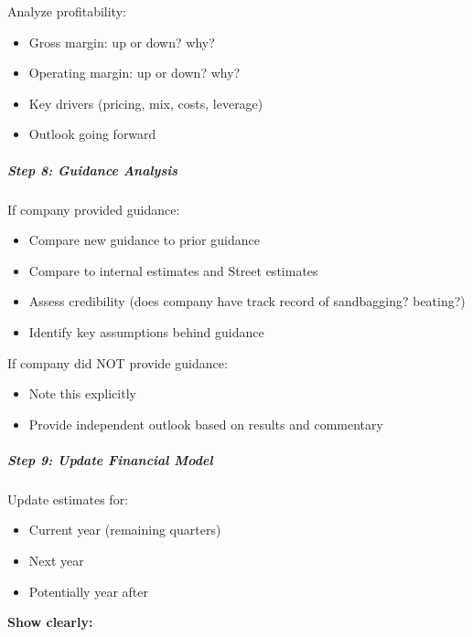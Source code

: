 \documentclass[11pt]{article}
\begin{document}
Analyze profitability:

\begin{itemize}[leftmargin=*,itemsep=2pt,topsep=2pt]
\item {} Gross margin: up or down? why?
\item {} Operating margin: up or down? why?
\item {} Key drivers (pricing, mix, costs, leverage)
\item {} Outlook going forward
\end{itemize}

\subparagraph{Step 8: Guidance Analysis}\mbox{}\par

If company provided guidance:

\begin{itemize}[leftmargin=*,itemsep=2pt,topsep=2pt]
\item {} Compare new guidance to prior guidance
\item {} Compare to internal estimates and Street estimates
\item {} Assess credibility (does company have track record of sandbagging? beating?)
\item {} Identify key assumptions behind guidance
\end{itemize}

If company did NOT provide guidance:

\begin{itemize}[leftmargin=*,itemsep=2pt,topsep=2pt]
\item {} Note this explicitly
\item {} Provide independent outlook based on results and commentary
\end{itemize}

\subparagraph{Step 9: Update Financial Model}\mbox{}\par

Update estimates for:

\begin{itemize}[leftmargin=*,itemsep=2pt,topsep=2pt]
\item {} Current year (remaining quarters)
\item {} Next year
\item {} Potentially year after
\end{itemize}

\textbf{Show clearly:}
\end{document}
